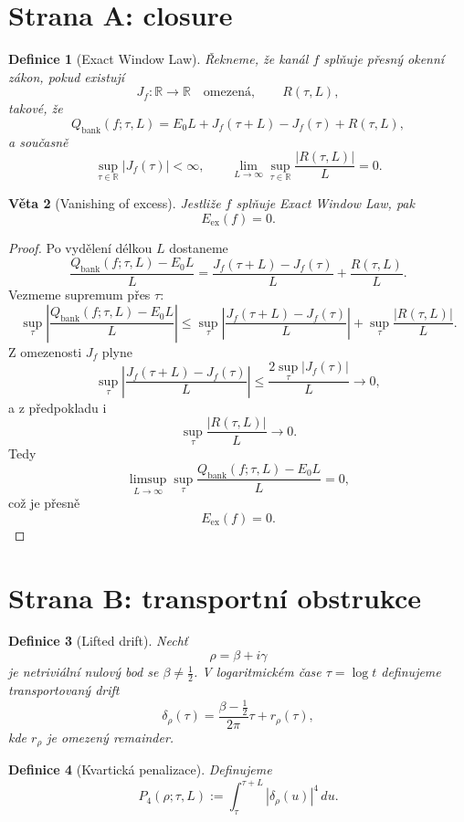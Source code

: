 \documentclass[11pt,a4paper]{article}
\newtheorem{theorem}{Věta}[section]
\newtheorem{definition}[theorem]{Definice}
\begin{document}
\section{Strana A: closure}

\begin{definition}[Exact Window Law]
Řekneme, že kanál \(f\) splňuje přesný okenní zákon, pokud existují
\[
J_f:\mathbb{R}\to\mathbb{R}
\quad\text{omezená},\qquad
R(\tau,L),
\]
takové, že
\[
Q_{\mathrm{bank}}(f;\tau,L)
=
E_0L+J_f(\tau+L)-J_f(\tau)+R(\tau,L),
\]
a současně
\[
\sup_{\tau\in\mathbb{R}}|J_f(\tau)|<\infty,
\qquad
\lim_{L\to\infty}\sup_{\tau\in\mathbb{R}}\frac{|R(\tau,L)|}{L}=0.
\]
\end{definition}

\begin{theorem}[Vanishing of excess]
Jestliže \(f\) splňuje Exact Window Law, pak
\[
E_{\mathrm{ex}}(f)=0.
\]
\end{theorem}

\begin{proof}
Po vydělení délkou \(L\) dostaneme
\[
\frac{Q_{\mathrm{bank}}(f;\tau,L)-E_0L}{L}
=
\frac{J_f(\tau+L)-J_f(\tau)}{L}
+
\frac{R(\tau,L)}{L}.
\]
Vezmeme supremum přes \(\tau\):
\[
\sup_\tau\left|
\frac{Q_{\mathrm{bank}}(f;\tau,L)-E_0L}{L}
\right|
\le
\sup_\tau\left|
\frac{J_f(\tau+L)-J_f(\tau)}{L}
\right|
+
\sup_\tau \frac{|R(\tau,L)|}{L}.
\]
Z omezenosti \(J_f\) plyne
\[
\sup_\tau\left|
\frac{J_f(\tau+L)-J_f(\tau)}{L}
\right|
\le
\frac{2\sup_\tau |J_f(\tau)|}{L}\to 0,
\]
a z předpokladu i
\[
\sup_\tau \frac{|R(\tau,L)|}{L}\to 0.
\]
Tedy
\[
\limsup_{L\to\infty}\sup_\tau
\frac{Q_{\mathrm{bank}}(f;\tau,L)-E_0L}{L}=0,
\]
což je přesně
\[
E_{\mathrm{ex}}(f)=0.
\]
\end{proof}

\section{Strana B: transportní obstrukce}

\begin{definition}[Lifted drift]
Nechť
\[
\rho=\beta+i\gamma
\]
je netriviální nulový bod se \(\beta\neq \frac12\). V logaritmickém čase \(\tau=\log t\) definujeme
transportovaný drift
\[
\delta_\rho(\tau)=\frac{\beta-\tfrac12}{2\pi}\tau+r_\rho(\tau),
\]
kde \(r_\rho\) je omezený remainder.
\end{definition}

\begin{definition}[Kvartická penalizace]
Definujeme
\[
P_4(\rho;\tau,L):=\int_\tau^{\tau+L} |\delta_\rho(u)|^4\,du.
\]
\end{definition}
\end{document}
